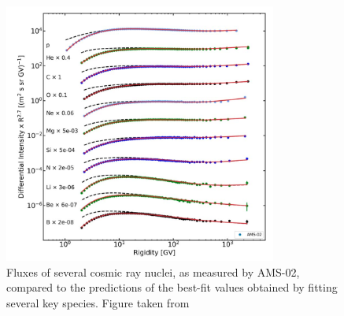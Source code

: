 \begin{figure}[hbtp]
    \centering
    \includegraphics[width=0.8\textwidth]{figures/Boscini_Fits.png}
    \caption{Fluxes of several cosmic ray nuclei, as measured by AMS-02, compared to the predictions of the best-fit values obtained by fitting several key species. Figure taken from \cite{Boschini:2018baj}}
    \label{fig:BosciniFits}
\end{figure}

